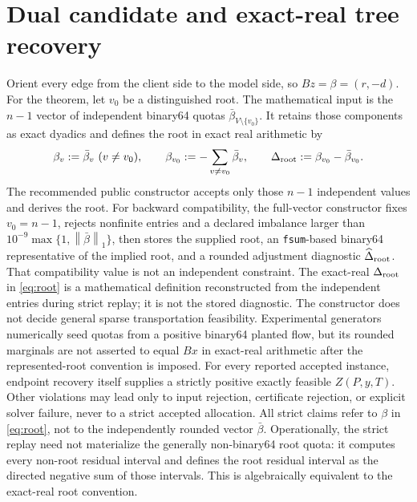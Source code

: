 \documentclass[smallextended,envcountsect]{svjour3}
\newcommand{\norm}[1]{\left\lVert#1\right\rVert}
\begin{document}
\section{Dual candidate and exact-real tree recovery}
\label{sec:recovery}

Orient every edge from the client side to the model side, so $Bz=\beta=(r,-d)$.
For the theorem, let $v_0$ be a distinguished root.  The mathematical input is
the $n-1$ vector of independent binary64 quotas
$\bar\beta_{V\setminus\{v_0\}}$.  It retains those components as exact dyadics
and defines the root in exact real arithmetic by
\begin{equation}
 \beta_v:=\bar\beta_v\ (v\ne v_0),\qquad
 \beta_{v_0}:=-\sum_{v\ne v_0}\bar\beta_v,\qquad
 \Delta_{\rm root}:=\beta_{v_0}-\bar\beta_{v_0}.
 \label{eq:root}
\end{equation}
The recommended public constructor accepts only those $n-1$ independent values
and derives the root.  For backward compatibility, the full-vector constructor
fixes $v_0=n-1$, rejects nonfinite entries and a declared imbalance larger than
$10^{-9}\max\{1,\norm{\bar\beta}_1\}$, then stores the supplied root, an
\texttt{fsum}-based binary64 representative of the implied root, and a rounded
adjustment diagnostic $\widehat\Delta_{\rm root}$.  That compatibility value is
not an independent constraint.  The exact-real
$\Delta_{\rm root}$ in \cref{eq:root} is a mathematical definition reconstructed
from the independent entries during strict replay; it is not the stored
diagnostic.  The constructor does not decide general sparse transportation
feasibility.  Experimental generators numerically seed quotas from a positive
binary64 planted flow, but its rounded marginals are not asserted to equal
$Bx$ in exact-real arithmetic after the represented-root convention is imposed.
For every reported accepted instance, endpoint recovery itself supplies a
strictly positive exactly feasible $Z(P,y,T)$.  Other violations may lead only
to input rejection, certificate rejection, or explicit solver failure, never
to a strict accepted allocation.  All strict claims refer
to $\beta$ in \cref{eq:root}, not to the independently rounded vector
$\bar\beta$.
Operationally, the strict replay need not materialize the generally
non-binary64 root quota: it computes every non-root residual interval and
defines the root residual interval as the directed negative sum of those
intervals.  This is algebraically equivalent to the exact-real root convention.
\end{document}
